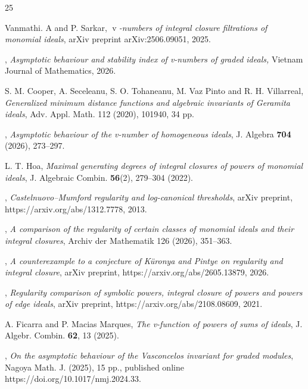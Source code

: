 \documentclass[11pt,reqno,a4paper]{amsart}
\theoremstyle{definition}
\begin{document}
\begin{thebibliography}{25}


Vanmathi. A and P. Sarkar,
\textit{$\operatorname{v}$-numbers of integral closure filtrations of monomial ideals},
arXiv preprint arXiv:2506.09051, 2025.


, \textit{Asymptotic behaviour and stability index of v-numbers of graded ideals,} Vietnam Journal of Mathematics, 2026.


 {S. M. Cooper, A. Seceleanu, S. O. Tohaneanu, M. Vaz Pinto and R. H. Villarreal}, \textit{ Generalized minimum
distance functions and algebraic invariants of Geramita ideals}, Adv. Appl. Math. 112 (2020), 101940,
34 pp.

, \textit {Asymptotic behaviour of the v-number of homogeneous ideals}, J. Algebra \textbf{704} (2026), 273--297.


L. T. Hoa,
\textit{Maximal generating degrees of integral closures of powers of monomial ideals},
J. Algebraic Combin. \textbf{56}(2), 279--304 (2022).



, \textit{Castelnuovo–Mumford regularity and log-canonical thresholds}, arXiv preprint, https://arxiv.org/abs/1312.7778, 2013.

, \textit {A comparison of the regularity of certain classes of monomial ideals and their integral closures},
Archiv der Mathematik 126 (2026), 351–363.


, \textit {A counterexample to a conjecture of Küronya and Pintye on regularity and integral closure},  arXiv preprint, https://arxiv.org/abs/2605.13879, 2026. 


, \textit {Regularity comparison of symbolic powers, integral closure of powers and powers of edge ideals}, arXiv preprint, https://arxiv.org/abs/2108.08609, 2021.

 A. Ficarra and P. Macias Marques, \textit{The v-function of powers of sums of ideals}, J. Algebr. Combin. \textbf{62}, 13 (2025).


, \textit{ On the asymptotic behaviour of the Vasconcelos invariant for graded modules}, Nagoya Math. J. (2025), 15 pp., published online
https://doi.org/10.1017/nmj.2024.33.




\end{thebibliography}
\end{document}
